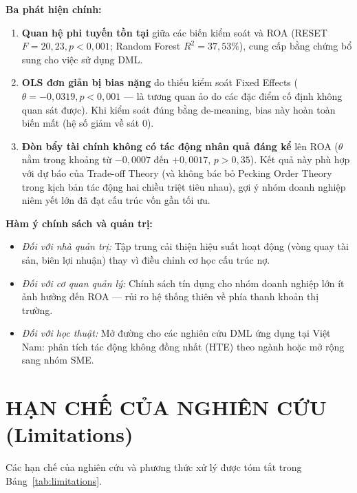 \documentclass[12pt,a4paper]{article}
\begin{document}
\noindent\textbf{Ba phát hiện chính:}
\begin{enumerate}
    \item \textbf{Quan hệ phi tuyến tồn tại} giữa các biến kiểm soát và ROA (RESET $F = 20,23, p < 0,001$; Random Forest $R^2 = 37,53\%$), cung cấp bằng chứng bổ sung cho việc sử dụng DML.
    \item \textbf{OLS đơn giản bị bias nặng} do thiếu kiểm soát Fixed Effects ($\theta = -0,0319, p < 0,001$ --- là tương quan ảo do các đặc điểm cố định không quan sát được). Khi kiểm soát đúng bằng de-meaning, bias này hoàn toàn biến mất (hệ số giảm về sát 0).
    \item \textbf{Đòn bẩy tài chính không có tác động nhân quả đáng kể} lên ROA ($\theta$ nằm trong khoảng từ $-0,0007$ đến $+0,0017$, $p > 0,35$). Kết quả này phù hợp với dự báo của Trade-off Theory (và không bác bỏ Pecking Order Theory trong kịch bản tác động hai chiều triệt tiêu nhau), gợi ý nhóm doanh nghiệp niêm yết lớn đã đạt cấu trúc vốn gần tối ưu.
\end{enumerate}

\noindent\textbf{Hàm ý chính sách và quản trị:}
\begin{itemize}
    \item \textit{Đối với nhà quản trị:} Tập trung cải thiện hiệu suất hoạt động (vòng quay tài sản, biên lợi nhuận) thay vì điều chỉnh cơ học cấu trúc nợ.
    \item \textit{Đối với cơ quan quản lý:} Chính sách tín dụng cho nhóm doanh nghiệp lớn ít ảnh hưởng đến ROA --- rủi ro hệ thống thiên về phía thanh khoản thị trường.
    \item \textit{Đối với học thuật:} Mở đường cho các nghiên cứu DML ứng dụng tại Việt Nam: phân tích tác động không đồng nhất (HTE) theo ngành hoặc mở rộng sang nhóm SME.
\end{itemize}

\section{HẠN CHẾ CỦA NGHIÊN CỨU (Limitations)}
Các hạn chế của nghiên cứu và phương thức xử lý được tóm tắt trong Bảng~\ref{tab:limitations}.
\end{document}
